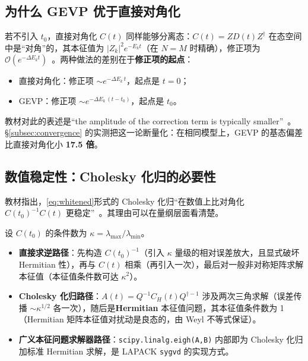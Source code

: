 \documentclass[12pt,a4paper]{ctexart}
\theoremstyle{definition}
\newcommand{\Order}{\mathcal{O}}
\newcommand{\dagg}{\dagger}
\newcommand{\code}[1]{\texttt{#1}}
\begin{document}
\subsection{为什么 GEVP 优于直接对角化}

若不引入 $t_0$，直接对角化 $C(t)$ 同样能够分离态：$C(t) = ZD(t)Z^\dagg$ 在态空间中是``对角''的，其本征值为 $|Z_k|^2 e^{-E_k t}$（在 $N=M$ 时精确），修正项为 $\Order(e^{-\Delta E_k t})$~\cite{GattringerLang2010}。两种做法的差别在于\textbf{修正项的起点}：

\begin{itemize}[nosep]
    \item 直接对角化：修正项 $\sim e^{-\Delta E_k\,t}$，起点是 $t=0$；
    \item GEVP：修正项 $\sim e^{-\Delta E_k\,(t-t_0)}$，起点是 $t_0$。
\end{itemize}

教材对此的表述是``the amplitude of the correction term is typically smaller''~\cite{GattringerLang2010}。§\ref{subsec:convergence} 的实测把这一论断量化：在相同模型上，GEVP 的基态偏差比直接对角化小 \textbf{17.5 倍}。

\subsection{数值稳定性：Cholesky 化归的必要性}

教材指出，\eqref{eq:whitened}形式的 Cholesky 化归``在数值上比对角化 $C(t_0)^{-1}C(t)$ 更稳定''~\cite{GattringerLang2010}。其理由可以在量纲层面看清楚。

设 $C(t_0)$ 的条件数为 $\kappa = \lambda_{\max}/\lambda_{\min}$。

\begin{itemize}[nosep]
    \item \textbf{直接求逆路径}：先构造 $C(t_0)^{-1}$（引入 $\kappa$ 量级的相对误差放大，且显式破坏 Hermitian 性），再与 $C(t)$ 相乘（再引入一次），最后对一般非对称矩阵求解本征值（本征值条件数可达 $\kappa^2$）。
    \item \textbf{Cholesky 化归路径}：$A(t) = Q^{-1}C_H(t)Q^{\dagg-1}$ 涉及两次三角求解（误差传播 $\sim\kappa^{1/2}$ 各一次），随后是\textbf{Hermitian} 本征值问题，其本征值条件数为 1（Hermitian 矩阵本征值对扰动是良态的，由 Weyl 不等式保证）。
    \item \textbf{广义本征问题求解器路径}：\code{scipy.linalg.eigh(A,B)} 内部即为 Cholesky 化归加标准 Hermitian 求解，是 LAPACK \code{sygvd} 的实现方式。
\end{itemize}
\end{document}
